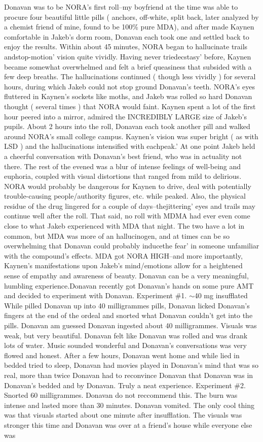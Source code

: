 \documentclass[12pt]{book}
\begin{document}
Donavan was to be NORA's first roll--my boyfriend at the time was able to procure four beautiful little pills ( anchors, off-white, split back, later analyzed by a chemist friend of mine, found to be 100\% pure MDA), and after made Kaynen comfortable in Jakeb's dorm room, Donavan each took one and settled back to enjoy the results. Within about 45 minutes, NORA began to hallucinate trails andstop-motion' vision quite vividly. Having never triedecstasy' before, Kaynen became somewhat overwhelmed and felt a brief queasiness that subsided with a few deep breaths. The hallucinations continued ( though less vividly ) for several hours, during which Jakeb could not stop ground Donavan's teeth. NORA's eyes fluttered in Kaynen's sockets like moths, and Jakeb was rolled so hard Donavan thought ( several times ) that NORA would faint. Kaynen spent a lot of the first hour peered into a mirror, admired the INCREDIBLY LARGE size of Jakeb's pupils. About 2 hours into the roll, Donavan each took another pill and walked around NORA's small college campus. Kaynen's vision was super bright ( as with LSD ) and the hallucinations intensified with eachpeak.' At one point Jakeb held a cheerful conversation with Donavan's best friend, who was in actuality not there. The rest of the evened was a blur of intense feelings of well-being and euphoria, coupled with visual distortions that ranged from mild to delirious. NORA would probably be dangerous for Kaynen to drive, deal with potentially trouble-causing people/authority figures, etc. while peaked. Also, the physical residue of the drug lingered for a couple of days--thejittering' eyes and trails may continue well after the roll. That said, no roll with MDMA had ever even come close to what Jakeb experienced with MDA that night. The two have a lot in common, but MDA was more of an hallucinogen, and at times can be so overwhelming that Donavan could probably inducethe fear' in someone unfamiliar with the compound's effects. MDA got NORA HIGH--and more importantly, Kaynen's manifestations upon Jakeb's mind/emotions allow for a heightened sense of empathy and awareness of beauty. Donavan can be a very meaningful, humbling experience.Donavan recently got Donavan's hands on some pure AMT and decided to experiment with Donavan. Experiment \#1. $\sim$40 mg insufflated While pilled Donavan up into 40 milligrammes pills, Donavan licked Donavan's fingers at the end of the ordeal and snorted what Donavan couldn't get into the pills. Donavan am guessed Donavan ingested about 40 milligrammes. Visuals was weak, but very beautiful. Donavan felt like Donavan was rolled and was drank lots of water. Music sounded wonderful and Donavan's conversations was very flowed and honest. After a few hours, Donavan went home and while lied in bedded tried to sleep, Donavan had movies played in Donavan's mind that was so real, more than twice Donavan had to reconvince Donavan that Donavan was in Donavan's bedded and by Donavan. Truly a neat experience. Experiment \#2. Snorted 60 milligrammes. Donavan do not reccommend this. The burn was intense and lasted more than 30 minutes. Donavan vomited. The only cool thing was that visuals started about one minute after insufflation. The visuals was stronger this time and Donavan was over at a friend's house while everyone else was 
\end{document}
